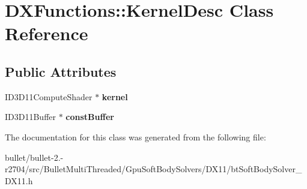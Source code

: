 \hypertarget{class_d_x_functions_1_1_kernel_desc}{\section{D\+X\+Functions\+:\+:Kernel\+Desc Class Reference}
\label{class_d_x_functions_1_1_kernel_desc}
}
\subsection*{Public Attributes}
\begin{DoxyCompactItemize}
\item 
\hypertarget{class_d_x_functions_1_1_kernel_desc_a640e3a6067b344885474a252947e597a}{I\+D3\+D11\+Compute\+Shader $\ast$ {\bfseries kernel}}\label{class_d_x_functions_1_1_kernel_desc_a640e3a6067b344885474a252947e597a}

\item 
\hypertarget{class_d_x_functions_1_1_kernel_desc_a34374513a589354a2d7078d2d4c18caf}{I\+D3\+D11\+Buffer $\ast$ {\bfseries const\+Buffer}}\label{class_d_x_functions_1_1_kernel_desc_a34374513a589354a2d7078d2d4c18caf}

\end{DoxyCompactItemize}


The documentation for this class was generated from the following file\+:\begin{DoxyCompactItemize}
\item 
bullet/bullet-\/2.-\/r2704/src/\+Bullet\+Multi\+Threaded/\+Gpu\+Soft\+Body\+Solvers/\+D\+X11/bt\+Soft\+Body\+Solver\+\_\+\+D\+X11.\+h\end{DoxyCompactItemize}
